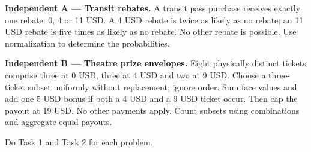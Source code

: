 \medskip
\noindent\begin{minipage}[t]{.48\linewidth}
\vspace{0pt}
\textbf{Independent A --- Transit rebates.}
A transit pass purchase receives exactly one rebate: 0, 4 or 11 USD.
A 4 USD rebate is twice as likely as no rebate; an 11 USD rebate is
five times as likely as no rebate. No other rebate is possible.
Use normalization to determine the probabilities.
\end{minipage}\hfill
\begin{minipage}[t]{.48\linewidth}
\vspace{0pt}
\textbf{Independent B --- Theatre prize envelopes.}
Eight physically distinct tickets comprise three at 0 USD, three at 4 USD
and two at 9 USD. Choose a three-ticket subset uniformly without replacement;
ignore order. Sum face values and add one 5 USD bonus if both a 4 USD and
a 9 USD ticket occur. Then cap the payout at 19 USD. No other payments apply.
Count subsets using combinations and aggregate equal payouts.
\end{minipage}\par
Do Task 1 and Task 2 for each problem.
\endgroup

